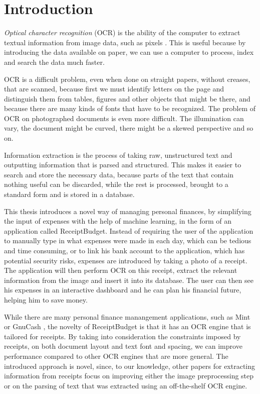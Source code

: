 \chapter{Introduction}
\textit{Optical character recognition} (OCR) is the ability of the computer to extract textual information from image data, such as pixels \cite{schantz1982history}. This is useful because by introducing the data available on paper, we can use a computer to process, index and search the data much faster.  

OCR is a difficult problem, even when done on straight papers, without creases, that are scanned, because first we must identify letters on the page and distinguish them from tables, figures and other objects that might be there, and because there are many kinds of fonts that have to be recognized. The problem of OCR on photographed documents is even more difficult. The illumination can vary, the document might be curved, there might be a skewed perspective and so on. 

Information extraction is the process of taking raw, unstructured text and outputting information that is parsed and structured. This makes it easier to search and store the necessary data, because parts of the text that contain nothing useful can be discarded, while the rest is processed, brought to a standard form and is stored in a database. 

This thesis introduces a novel way of managing personal finances, by simplifying the input of expenses with the help of machine learning, in the form of an application called ReceiptBudget. Instead of requiring the user of the application to manually type in what expenses were made in each day, which can be tedious and time consuming, or to link his bank account to the application, which has potential security risks, expenses are introduced by taking a photo of a receipt. The application will then perform OCR on this receipt, extract the relevant information from the image and insert it into its database. The user can then see his expenses in an interactive dashboard and he can plan his financial future, helping him to save money. 

While there are many personal finance manangement applications, such as Mint \cite{mint} or GnuCash \cite{gnucash}, the novelty of ReceiptBudget is that it has an OCR engine that is tailored for receipts. By taking into consideration the constraints imposed by receipts, on both document layout and text font and spacing, we can improve performance compared to other OCR engines that are more general. The introduced approach is novel, since, to our knowledge, other papers for extracting information from receipts focus on improving either the image preprocessing step or on the parsing of text that was extracted using an off-the-shelf OCR engine.

